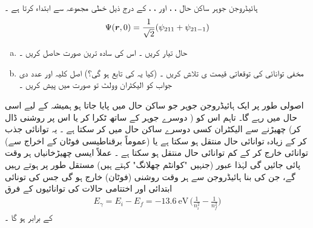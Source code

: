ہائیڈروجن  جوہر ساکن  حال ، ،   اور  ، ،   کے درج ذیل خطی  مجموعہ   سے ابتداء کرتا ہے ۔
\begin{align*}
\Psi({{\boldsymbol{r}}},0)=\frac{1}{\sqrt{2}}(\psi_{211}+\psi_{21-1})
\end{align*}
\begin{enumerate}[a.]
\item
حال  تیار کریں ۔ اس کی سادہ ترین صورت حاصل کریں ۔
\item
مخفی توانائی  کی توقعاتی قیمت ی    تلاش کریں ۔ (کیا یہ   کی  تابع ہو گی؟)  اصل کلیہ اور عدد دی جواب   کو الیکٹران وولٹ تو صورت میں پیش کریں ۔
\end{enumerate}

اصولی طور پر ایک ہائیڈروجن جوہر جو ساکن حال  میں پایا جاتا ہو  ہمیشہ کے لیے اسی حال میں رہے گا۔ تاہم اس کو (  دوسرے جوہر کے ساتھ ٹکرا کر  یا اس پر روشنی  ڈال کر)  چھیڑنے سے الیکٹران کسی دوسرے ساکن حال میں  کر سکتا ہے ۔ یہ توانائی جذب کر کے زیادہ توانائی  حال منتقل ہو سکتا ہے یا   (عموماً   برقناطیسی   فوٹان کے  اخراج   سے)     توانائی خارج کر  کے کم توانائی  حال  منتقل ہو سکتا ہے ۔ عملاً  ایسی چھیڑخانیاں  ہر وقت پائی جائیں گی لہٰذا عبور (جنہیں  "کوانٹم  چھلانگ" کہتے ہیں)   مستقل طور پر ہوتے  رہیں    گے، جن  کی  بنا  ہائیڈروجن  سے ہر وقت   روشنی (فوٹان)  خارج ہو گی جس کی تونائی   ابتدائی اور اختتامی حالات کی  توانائیوں  کے فرق
\begin{align}
E_{\gamma}=E_{i}-E_{f}=\SI{-13.6}{\electronvolt}\,\big(\frac{1}{n^{2}_{i}}-\frac{1}{n^{2}_{f}}\big)
\end{align}
 کے برابر ہو گا ۔
 
